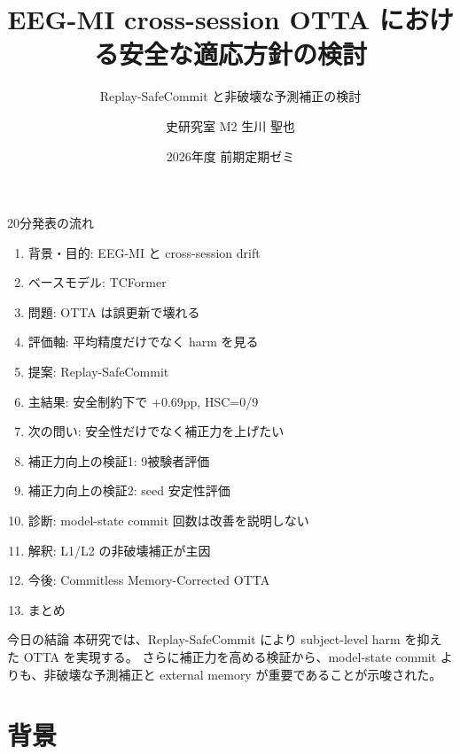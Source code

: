 \documentclass[unicode,aspectratio=169,12pt]{beamer}
\title[EEG-MI OTTA]{EEG-MI cross-session OTTA における安全な適応方針の検討}
\subtitle{Replay-SafeCommit と非破壊な予測補正の検討}
\author{史研究室 M2 \quad 生川 聖也}
\date{2026年度 前期定期ゼミ}
\begin{document}
\begin{frame}
  \titlepage
\end{frame}

\begin{frame}{20分発表の流れ}
  \small
  \begin{enumerate}
    \item 背景・目的: EEG-MI と cross-session drift
    \item ベースモデル: TCFormer
    \item 問題: OTTA は誤更新で壊れる
    \item 評価軸: 平均精度だけでなく harm を見る
    \item 提案: Replay-SafeCommit
    \item 主結果: 安全制約下で +0.69pp, HSC=0/9
    \item 次の問い: 安全性だけでなく補正力を上げたい
    \item 補正力向上の検証1: 9被験者評価
    \item 補正力向上の検証2: seed 安定性評価
    \item 診断: model-state commit 回数は改善を説明しない
    \item 解釈: L1/L2 の非破壊補正が主因
    \item 今後: Commitless Memory-Corrected OTTA
    \item まとめ
  \end{enumerate}
  \vspace{0.8em}
  \begin{block}{今日の結論}
    本研究では、Replay-SafeCommit により subject-level harm を抑えた OTTA を実現する。
    さらに補正力を高める検証から、model-state commit よりも、非破壊な予測補正と external memory が重要であることが示唆された。
  \end{block}
\end{frame}

\section{背景}
\end{document}
